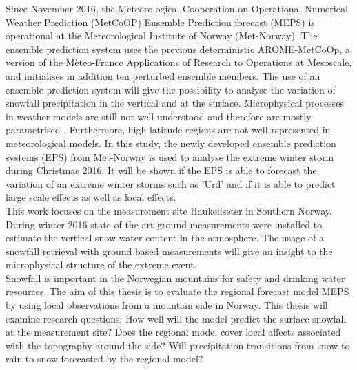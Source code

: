 % 
Since November 2016, the Meteorological Cooperation on Operational Numerical Weather Prediction (MetCoOP) Ensemble Prediction forecast (MEPS) is operational at the Meteorological Institute of Norway (Met-Norway). The ensemble prediction system uses the previous deterministic AROME-MetCoOp, a version of the Mèteo-France Applications of Research to Operations at Mesoscale, and initialises in addition ten perturbed ensemble members. The use of an ensemble prediction system will give the possibility to analyse the variation of snowfall precipitation in the vertical and at the surface.
Microphysical processes in weather models are still not well understood and therefore are mostly parametrised \citep{muller_arome-metcoop:_2017}. Furthermore, high latitude regions are not well represented in meteorological models. %
In this study, the newly developed ensemble prediction systems (EPS) from Met-Norway is used to analyse the extreme winter storm during Christmas 2016. It will be shown if the EPS is able to forecast the variation of an extreme winter storms such as 'Urd' and if it is able to predict large scale effects as well as local effects. 
\\
This work focuses on the measurement site Haukeliseter in Southern Norway. During winter 2016 state of the art ground measurements were installed to estimate the vertical snow water content in the atmosphere. The usage of a snowfall retrieval with ground based measurements will give an insight to the microphysical structure of the extreme event. %
\\
Snowfall is important in the Norwegian mountains for safety and drinking water resources. The aim of this thesis is to evaluate the regional forecast model MEPS by using local observations from a mountain side in Norway. This thesis will examine research questions: How well will the model predict the surface snowfall at the measurement site? 
Does the regional model cover local affects associated with the topography around the side? Will precipitation transitions from snow to rain to snow forecasted by the regional model?
